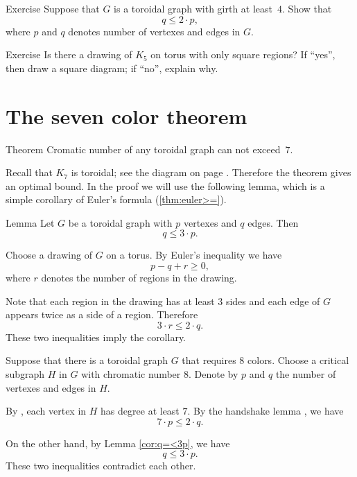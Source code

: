 \begin{thm}{Exercise}
Suppose that $G$ is a toroidal graph with girth at least~$4$.
Show that 
\[q\le 2\cdot p,\]
where $p$ and $q$ denotes number of vertexes and edges in $G$.
\end{thm}

\begin{thm}{Exercise}
Is there a drawing of $K_5$ on torus with only square regions?
If ``yes'', then draw a square diagram; if ``no'', explain why.
\end{thm}

\section*{The seven color theorem}

\begin{thm}{Theorem}\label{thm:7-colors}
Cromatic number of any toroidal graph can not exceed~$7$.
\end{thm}

Recall that $K_7$ is toroidal; see the diagram on page \pageref{K5-toroidal}.
Therefore the theorem gives an optimal bound.
In the proof we will use the following lemma, which is a simple corollary of Euler's formula (\ref{thm:euler>=}).

\begin{thm}{Lemma}\label{cor:q=<3p}
Let $G$ be a toroidal graph with $p$ vertexes and $q$ edges.
Then 
\[q\le 3\cdot p.\]

\end{thm}

Choose a drawing of $G$ on a torus.
By Euler's inequality we have
\[p-q+r\ge 0,\]
where $r$ denotes the number of regions in the drawing.

Note that each region in the drawing has at least $3$ sides
and each edge of $G$ appears twice as a side of a region.
Therefore 
\[3\cdot r\le 2\cdot q.\]
These two inequalities imply the corollary.
\qeds


Suppose that there is a toroidal graph $G$ that requires $8$ colors.
Choose a critical subgraph $H$ in $G$ with chromatic number 8.
Denote by $p$ and $q$ the number of vertexes and edges in $H$.

By \cite[2.1.3]{hartsfield-ringel}, each vertex in $H$ has degree at least $7$.
By the handshake lemma \cite[1.1.1]{hartsfield-ringel}, we have 
\[7\cdot p\le 2\cdot q.\]

On the other hand, by Lemma \ref{cor:q=<3p}, we have
\[q\le 3\cdot p.\]
These two inequalities contradict each other.
 \qeds

